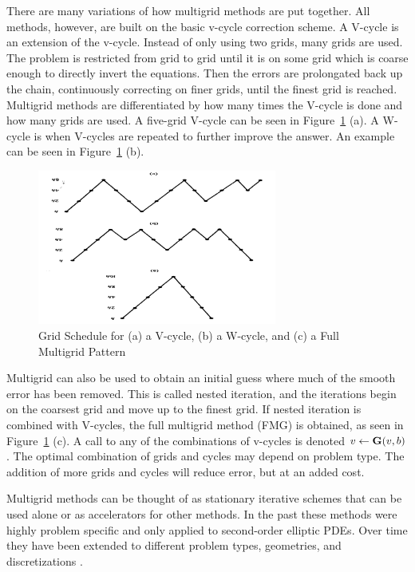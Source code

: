 There are many variations of how multigrid methods are put together. All methods, however, are built on the basic v-cycle correction scheme. A V-cycle is an extension of the v-cycle. Instead of only using two grids, many grids are used. The problem is restricted from grid to grid until it is on some grid which is coarse enough to directly invert the equations. Then the errors are prolongated back up the chain, continuously correcting on finer grids, until the finest grid is reached. Multigrid methods are differentiated by how many times the V-cycle is done and how many grids are used. A five-grid V-cycle can be seen in Figure~\ref{fig:Vcycle} (a). A W-cycle is when V-cycles are repeated to further improve the answer. An example can be seen in Figure~\ref{fig:Vcycle} (b). 
\begin{figure}
    \begin{center}
      \includegraphics [width=0.7\textwidth, height=0.7\textheight, angle=180 ] {multigridFig}
   \end{center}
   \caption{Grid Schedule for (a) a V-cycle, (b) a W-cycle, and (c) a Full Multigrid Pattern \cite{Briggs2000}}
   \label{fig:Vcycle}
\end{figure}

Multigrid can also be used to obtain an initial guess where much of the smooth error has been removed. This is called nested iteration, and the iterations begin on the coarsest grid and move up to the finest grid. If nested iteration is combined with V-cycles, the full multigrid method (FMG) is obtained, as seen in Figure~\ref{fig:Vcycle} (c). A call to any of the combinations of v-cycles is denoted $v \leftarrow \mathbf{G}(v, b)$. The optimal combination of grids and cycles may depend on problem type. The addition of more grids and cycles will reduce error, but at an added cost. 

Multigrid methods can be thought of as stationary iterative schemes that can be used alone or as accelerators for other methods. In the past these methods were highly problem specific and only applied to second-order elliptic PDEs. Over time they have been extended to different problem types, geometries, and discretizations \cite{Benzi2002}. 


